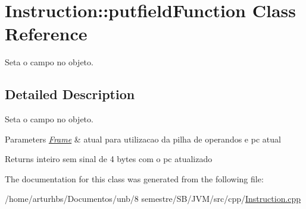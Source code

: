 \hypertarget{classInstruction_1_1putfieldFunction}{}\section{Instruction\+:\+:putfield\+Function Class Reference}
\label{classInstruction_1_1putfieldFunction}


Seta o campo no objeto.  




\subsection{Detailed Description}
Seta o campo no objeto. 


\begin{DoxyParams}{Parameters}
{\em \hyperlink{classFrame}{Frame}} & atual para utilizacao da pilha de operandos e pc atual \\
\hline
\end{DoxyParams}
\begin{DoxyReturn}{Returns}
inteiro sem sinal de 4 bytes com o pc atualizado 
\end{DoxyReturn}


The documentation for this class was generated from the following file\+:\begin{DoxyCompactItemize}
\item 
/home/arturhbs/\+Documentos/unb/8 semestre/\+S\+B/\+J\+V\+M/src/cpp/\hyperlink{Instruction_8cpp}{Instruction.\+cpp}\end{DoxyCompactItemize}
